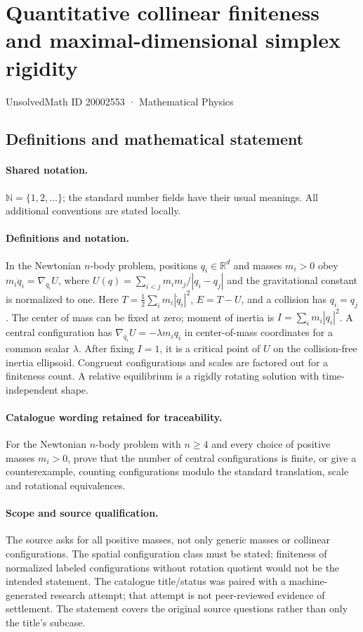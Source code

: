 \documentclass[11pt]{article}
\begin{document}
\setcounter{section}{20002552}
\section{Quantitative collinear finiteness and maximal-dimensional simplex rigidity}\label{20002553}
{\small UnsolvedMath ID 20002553 · Mathematical Physics}
\subsection{Definitions and mathematical statement}

\paragraph{Shared notation.}$\mathbb N=\{1,2,\ldots\}$; the standard number fields have their usual meanings. All additional conventions are stated locally.


\paragraph{Definitions and notation.}In the Newtonian $n$-body problem, positions $q_i\in\mathbb R^d$ and masses $m_i>0$ obey $m_i\ddot q_i=\nabla_{q_i}U$, where $U(q)=\sum_{i<j}m_im_j/|q_i-q_j|$ and the gravitational constant is normalized to one. Here $T=\tfrac12\sum_i m_i|\dot q_i|^2$, $E=T-U$, and a collision has $q_i=q_j$. The center of mass can be fixed at zero; moment of inertia is $I=\sum_i m_i|q_i|^2$. A central configuration has $\nabla_{q_i}U=-\lambda m_iq_i$ in center-of-mass coordinates for a common scalar $\lambda$. After fixing $I=1$, it is a critical point of $U$ on the collision-free inertia ellipsoid. Congruent configurations and scales are factored out for a finiteness count. A relative equilibrium is a rigidly rotating solution with time-independent shape. 

\paragraph{Catalogue wording retained for traceability.}
For the Newtonian $n$-body problem with $n\ge4$ and every choice of positive masses $m_i>0$, prove that the number of central configurations is finite, or give a counterexample, counting configurations modulo the standard translation, scale and rotational equivalences.
\paragraph{Scope and source qualification.}The source asks for all positive masses, not only generic masses or collinear configurations. The spatial configuration class must be stated; finiteness of normalized labeled configurations without rotation quotient would not be the intended statement. The catalogue title/status was paired with a machine-generated research attempt; that attempt is not peer-reviewed evidence of settlement. The statement covers the original source questions rather than only the title’s subcase.
\end{document}
